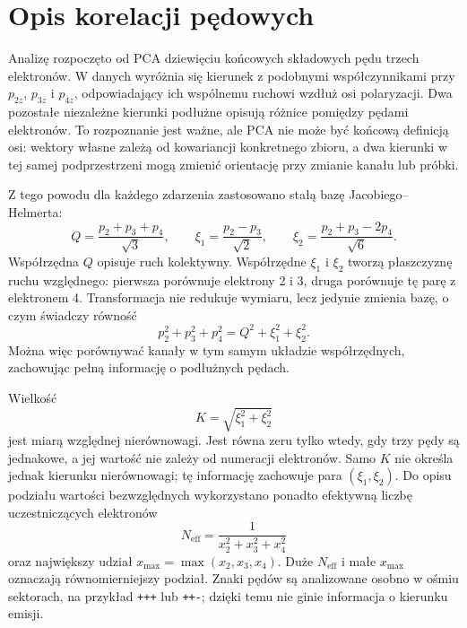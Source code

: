 \documentclass[12pt,letterpaper,oneside]{report}
\numberwithin{equation}{chapter}
\numberwithin{figure}{chapter}
\numberwithin{table}{chapter}
\newcommand{\Neff}{\ensuremath{N_{\mathrm{eff}}}}
\newcommand{\xmax}{\ensuremath{x_{\max}}}
\begin{document}
\chapter{Opis korelacji pędowych}

Analizę rozpoczęto od PCA dziewięciu końcowych składowych pędu trzech
elektronów. W danych wyróżnia się kierunek z podobnymi współczynnikami
przy \(p_{2z}\), \(p_{3z}\) i \(p_{4z}\), odpowiadający ich wspólnemu
ruchowi wzdłuż osi polaryzacji. Dwa pozostałe niezależne kierunki
podłużne opisują różnice pomiędzy pędami elektronów. To rozpoznanie jest
ważne, ale PCA nie może być końcową definicją osi: wektory własne zależą
od kowariancji konkretnego zbioru, a dwa kierunki w tej samej podprzestrzeni
mogą zmienić orientację przy zmianie kanału lub próbki.

Z tego powodu dla każdego zdarzenia zastosowano stałą bazę
Jacobiego--Helmerta:
\begin{equation}
Q=\frac{p_2+p_3+p_4}{\sqrt{3}},\qquad
\xi_1=\frac{p_2-p_3}{\sqrt{2}},\qquad
\xi_2=\frac{p_2+p_3-2p_4}{\sqrt{6}}.
\label{eq:helmert}
\end{equation}
Współrzędna \(Q\) opisuje ruch kolektywny. Współrzędne \(\xi_1\) i
\(\xi_2\) tworzą płaszczyznę ruchu względnego: pierwsza porównuje
elektrony 2 i 3, druga porównuje tę parę z elektronem 4. Transformacja
nie redukuje wymiaru, lecz jedynie zmienia bazę, o czym świadczy równość
\begin{equation}
p_2^2+p_3^2+p_4^2=Q^2+\xi_1^2+\xi_2^2.
\label{eq:norm}
\end{equation}
Można więc porównywać kanały w tym samym układzie współrzędnych, zachowując
pełną informację o podłużnych pędach.

Wielkość
\begin{equation}
K=\sqrt{\xi_1^2+\xi_2^2}
\label{eq:imbalance}
\end{equation}
jest miarą względnej nierównowagi. Jest równa zeru tylko wtedy, gdy trzy
pędy są jednakowe, a jej wartość nie zależy od numeracji elektronów. Samo
\(K\) nie określa jednak kierunku nierównowagi; tę informację zachowuje
para \((\xi_1,\xi_2)\). Do opisu podziału wartości bezwzględnych
wykorzystano ponadto efektywną liczbę uczestniczących elektronów
\begin{equation}
\Neff=\frac{1}{x_2^2+x_3^2+x_4^2}
\label{eq:neff}
\end{equation}
oraz największy udział \(\xmax=\max(x_2,x_3,x_4)\). Duże \(\Neff\) i
małe \(\xmax\) oznaczają równomierniejszy podział. Znaki pędów są
analizowane osobno w ośmiu sektorach, na przykład \texttt{+++} lub
\texttt{++-}; dzięki temu nie ginie informacja o kierunku emisji.
\end{document}
